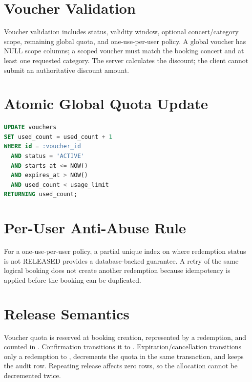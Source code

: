 \section{Voucher Validation}
Voucher validation includes status, validity window, optional concert/category
scope, remaining global quota, and one-use-per-user policy. A global voucher
has NULL scope columns; a scoped voucher must match the booking concert and at
least one requested category. The server calculates the discount; the client
cannot submit an authoritative discount amount.

\section{Atomic Global Quota Update}
\begin{lstlisting}[language=SQL,caption={Atomic voucher quota reservation}]
UPDATE vouchers
SET used_count = used_count + 1
WHERE id = :voucher_id
  AND status = 'ACTIVE'
  AND starts_at <= NOW()
  AND expires_at > NOW()
  AND used_count < usage_limit
RETURNING used_count;
\end{lstlisting}

\section{Per-User Anti-Abuse Rule}
For a one-use-per-user policy, a partial unique index on
 where redemption status is not RELEASED provides
a database-backed guarantee. A retry of the same logical booking does not
create another redemption because idempotency is applied before the booking can
be duplicated.

\section{Release Semantics}
Voucher quota is reserved at booking creation, represented by a
 redemption, and counted in . Confirmation
transitions it to . Expiration/cancellation transitions only a
 redemption to , decrements the quota in the same
transaction, and keeps the audit row. Repeating release affects zero rows, so
the allocation cannot be decremented twice.
